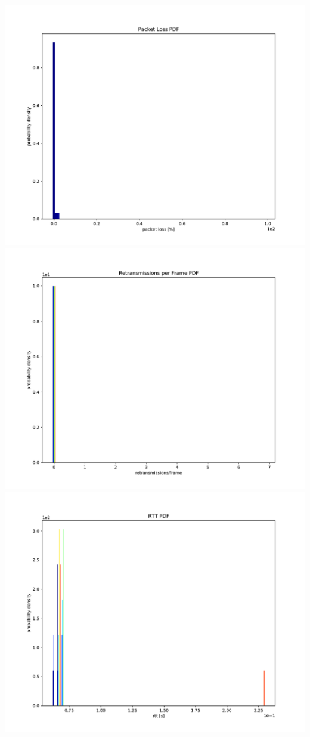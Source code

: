 \documentclass{article}
\begin{document}
	\includegraphics[width=\textwidth]{pdf/packet_loss_pdf}
	\includegraphics[width=\textwidth]{pdf/retransmissions_per_frame_pdf}
	\includegraphics[width=\textwidth]{pdf/rtt_pdf}
\end{document}
